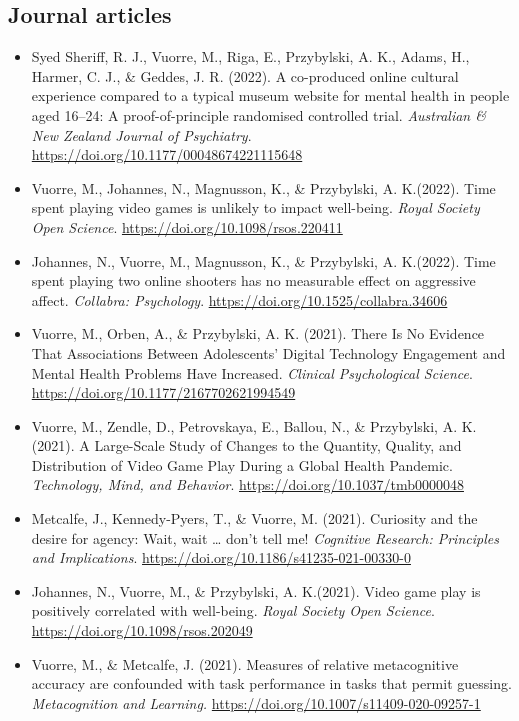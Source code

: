 \documentclass[12pt, a4paper]{article}
\newcommand{\years}[1]{\marginnote{\scriptsize #1}}
\begin{document}
\subsection*{Journal articles}
\begin{itemize}
\item \years{2022} Syed Sheriff, R. J., Vuorre, M., Riga, E., Przybylski, A. K., Adams, H., Harmer, C. J., \& Geddes, J. R. (2022). A co-produced online cultural experience compared to a typical museum website for mental health in people aged 16–24: A proof-of-principle randomised controlled trial. \emph{Australian \& New Zealand Journal of Psychiatry}. \url{https://doi.org/10.1177/00048674221115648}
\item Vuorre, M.\footnotemark[1], Johannes, N.\footnotemark[1], Magnusson, K., \& Przybylski, A. K.\footnotemark[1] (2022). Time spent playing video games is unlikely to impact well-being. \emph{Royal Society Open Science}. \url{https://doi.org/10.1098/rsos.220411}
\item Johannes, N.\footnotemark[1], Vuorre, M.\footnotemark[1], Magnusson, K., \& Przybylski, A. K.\footnotemark[1] (2022). Time spent playing two online shooters has no measurable effect on aggressive affect. \emph{Collabra: Psychology}. \url{https://doi.org/10.1525/collabra.34606}
\item \years{2021} Vuorre, M., Orben, A., \& Przybylski, A. K. (2021). There Is No Evidence That Associations Between Adolescents’ Digital Technology Engagement and Mental Health Problems Have Increased. \emph{Clinical Psychological Science}. \\ \url{https://doi.org/10.1177/2167702621994549}
\item Vuorre, M., Zendle, D., Petrovskaya, E., Ballou, N., \& Przybylski, A. K. (2021). A Large-Scale Study of Changes to the Quantity, Quality, and Distribution of Video Game Play During a Global Health Pandemic. \emph{Technology, Mind, and Behavior}. \url{https://doi.org/10.1037/tmb0000048}
\item Metcalfe, J., Kennedy-Pyers, T., \& Vuorre, M. (2021). Curiosity and the desire for agency: Wait, wait … don’t tell me! \emph{Cognitive Research: Principles and Implications}. \url{https://doi.org/10.1186/s41235-021-00330-0}
\item Johannes, N.\footnotemark[1], Vuorre, M.\footnotemark[1], \& Przybylski, A. K.\footnotemark[1] (2021). Video game play is positively correlated with well-being. \emph{Royal Society Open Science}. \url{https://doi.org/10.1098/rsos.202049}
\item Vuorre, M., \& Metcalfe, J. (2021). Measures of relative metacognitive accuracy are confounded with task performance in tasks that permit guessing. \emph{Metacognition and Learning.} \url{https://doi.org/10.1007/s11409-020-09257-1}


\end{itemize}
\end{document}

